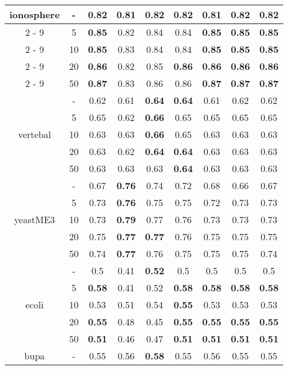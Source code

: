 \documentclass{article}%
\begin{document}
\begin{tabular}{c|c|ccccccc}
\hline%
\multirow{5}{*}{ionosphere}&{-}&\textbf{0.82}&0.81&\textbf{0.82}&\textbf{0.82}&0.81&\textbf{0.82}&\textbf{0.82}\\%
\cline{2%
-%
9}%
&5&\textbf{0.85}&0.82&0.84&0.84&\textbf{0.85}&\textbf{0.85}&\textbf{0.85}\\%
\cline{2%
-%
9}%
&10&\textbf{0.85}&0.83&0.84&0.84&\textbf{0.85}&\textbf{0.85}&\textbf{0.85}\\%
\cline{2%
-%
9}%
&20&\textbf{0.86}&0.82&0.85&\textbf{0.86}&\textbf{0.86}&\textbf{0.86}&\textbf{0.86}\\%
\cline{2%
-%
9}%
&50&\textbf{0.87}&0.83&0.86&0.86&\textbf{0.87}&\textbf{0.87}&\textbf{0.87}\\%
\hline%
\multirow{5}{*}{vertebal}&{-}&0.62&0.61&\textbf{0.64}&\textbf{0.64}&0.61&0.62&0.62\\%
\cline{2%
-%
9}%
&5&0.65&0.62&\textbf{0.66}&0.65&0.65&0.65&0.65\\%
\cline{2%
-%
9}%
&10&0.63&0.63&\textbf{0.66}&0.65&0.63&0.63&0.63\\%
\cline{2%
-%
9}%
&20&0.63&0.62&\textbf{0.64}&\textbf{0.64}&0.63&0.63&0.63\\%
\cline{2%
-%
9}%
&50&0.63&0.63&0.63&\textbf{0.64}&0.63&0.63&0.63\\%
\hline%
\multirow{5}{*}{yeastME3}&{-}&0.67&\textbf{0.76}&0.74&0.72&0.68&0.66&0.67\\%
\cline{2%
-%
9}%
&5&0.73&\textbf{0.76}&0.75&0.75&0.72&0.73&0.73\\%
\cline{2%
-%
9}%
&10&0.73&\textbf{0.79}&0.77&0.76&0.73&0.73&0.73\\%
\cline{2%
-%
9}%
&20&0.75&\textbf{0.77}&\textbf{0.77}&0.76&0.75&0.75&0.75\\%
\cline{2%
-%
9}%
&50&0.74&\textbf{0.77}&0.76&0.75&0.75&0.75&0.74\\%
\hline%
\multirow{5}{*}{ecoli}&{-}&0.5&0.41&\textbf{0.52}&0.5&0.5&0.5&0.5\\%
\cline{2%
-%
9}%
&5&\textbf{0.58}&0.41&0.52&\textbf{0.58}&\textbf{0.58}&\textbf{0.58}&\textbf{0.58}\\%
\cline{2%
-%
9}%
&10&0.53&0.51&0.54&\textbf{0.55}&0.53&0.53&0.53\\%
\cline{2%
-%
9}%
&20&\textbf{0.55}&0.48&0.45&\textbf{0.55}&\textbf{0.55}&\textbf{0.55}&\textbf{0.55}\\%
\cline{2%
-%
9}%
&50&\textbf{0.51}&0.46&0.47&\textbf{0.51}&\textbf{0.51}&\textbf{0.51}&\textbf{0.51}\\%
\hline%
\multirow{5}{*}{bupa}&{-}&0.55&0.56&\textbf{0.58}&0.55&0.56&0.55&0.55\\%

\end{tabular}
\end{document}
